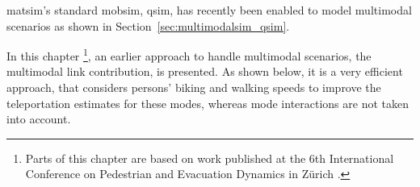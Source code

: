 \gls{matsim}'s standard \gls{mobsim}, \gls{qsim}, has recently been enabled to model \gls{multimodal} scenarios as shown in Section~\ref{sec:multimodalsim_qsim}.

In this chapter \footnote{Parts of this chapter are based on work published at the 6th International Conference on Pedestrian and Evacuation Dynamics in Zürich \cite{00DoblerLaemmelAxhausen2012PedMultiModal}.},
 an earlier approach to handle \gls{multimodal} scenarios, the \gls{multimodal} link \gls{contribution}, is presented. As shown below, it is a very efficient approach, that considers persons' biking and walking speeds to improve the \gls{teleportation} estimates for these modes, whereas mode interactions are not taken into account. 


